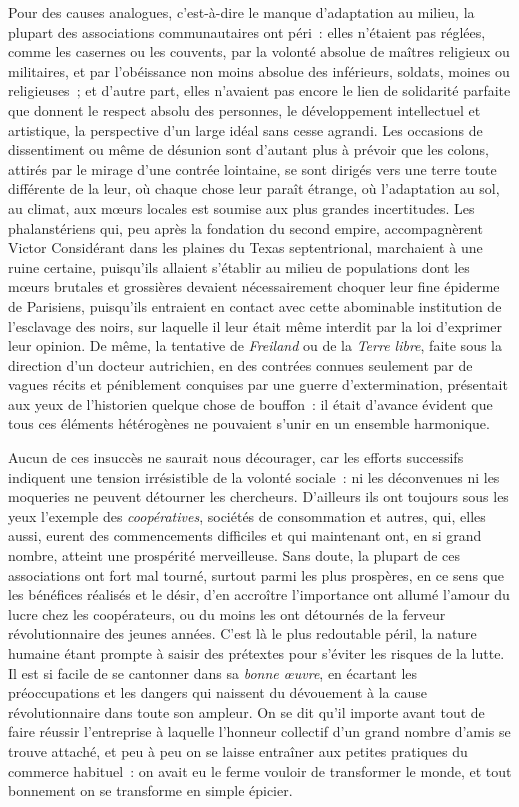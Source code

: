 \documentclass[french,twoside]{book} %
\begin{document}
Pour des causes analogues, c’est-à-dire le manque d’adaptation au milieu, la plupart des associations communautaires ont péri : elles n’étaient pas réglées, comme les casernes ou les couvents, par la volonté absolue de maîtres religieux ou militaires, et par l’obéissance  non moins absolue des inférieurs, soldats, moines ou religieuses ; et d’autre part, elles n’avaient pas encore le lien de solidarité parfaite que donnent le respect absolu des personnes, le développement intellectuel et artistique, la perspective d’un large idéal sans cesse agrandi. Les occasions de dissentiment ou même de désunion sont d’autant plus à prévoir que les colons, attirés par le mirage d’une contrée lointaine, se sont dirigés vers une terre toute différente de la leur, où chaque chose leur paraît étrange, où l’adaptation au sol, au climat, aux mœurs locales est soumise aux plus grandes incertitudes. Les phalanstériens qui, peu après la fondation du second empire, accompagnèrent Victor Considérant  dans les plaines du Texas septentrional, marchaient à une ruine certaine, puisqu’ils allaient s’établir au milieu de populations dont les mœurs brutales et grossières devaient nécessairement choquer leur fine épiderme de Parisiens, puisqu’ils entraient en contact avec cette abominable institution de l’esclavage des noirs, sur laquelle il leur était même interdit par la loi d’exprimer leur opinion. De même, la tentative de \emph{Freiland} ou de la \emph{Terre libre}, faite sous la direction d’un docteur autrichien, en des contrées connues seulement par de vagues récits et péniblement conquises par une guerre d’extermination, présentait aux yeux de l’historien quelque chose de bouffon : il était d’avance évident que tous ces éléments hétérogènes  ne pouvaient s’unir en un ensemble harmonique.\par
Aucun de ces insuccès ne saurait nous décourager, car les efforts successifs indiquent une tension irrésistible de la volonté sociale : ni les déconvenues ni les moqueries ne peuvent détourner les chercheurs. D’ailleurs ils ont toujours sous les yeux l’exemple des \emph{coopératives}, sociétés de consommation et autres, qui, elles aussi, eurent des commencements difficiles et qui maintenant ont, en si grand nombre, atteint une prospérité merveilleuse. Sans doute, la plupart de ces associations ont fort mal tourné, surtout parmi les plus prospères, en ce sens que les bénéfices réalisés et le désir, d’en accroître l’importance ont allumé l’amour du lucre chez  les coopérateurs, ou du moins les ont détournés de la ferveur révolutionnaire des jeunes années. C’est là le plus redoutable péril, la nature humaine étant prompte à saisir des prétextes pour s’éviter les risques de la lutte. Il est si facile de se cantonner dans sa \emph{bonne œuvre}, en écartant les préoccupations et les dangers qui naissent du dévouement à la cause révolutionnaire dans toute son ampleur. On se dit qu’il importe avant tout de faire réussir l’entreprise à laquelle l’honneur collectif d’un grand nombre d’amis se trouve attaché, et peu à peu on se laisse entraîner aux petites pratiques du commerce habituel : on avait eu le ferme vouloir de transformer le monde, et tout bonnement on se transforme en simple épicier.\par
\end{document}
